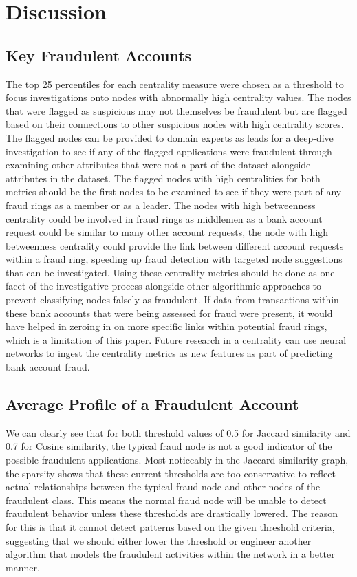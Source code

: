 \documentclass{styles/svproc}
\begin{document}
\section{Discussion}

\subsection{Key Fraudulent Accounts}
The top 25 percentiles for each centrality measure were chosen as a threshold to focus investigations onto nodes with abnormally high centrality values. The nodes that were flagged as suspicious may not themselves be fraudulent but are flagged based on their connections to other suspicious nodes with high centrality scores. The flagged nodes can be provided to domain experts as leads for a deep-dive investigation to see if any of the flagged applications were fraudulent through examining other attributes that were not a part of the dataset alongside attributes in the dataset. The flagged nodes with high centralities for both metrics should be the first nodes to be examined to see if they were part of any fraud rings as a member or as a leader. The nodes with high betweenness centrality could be involved in fraud rings as middlemen as a bank account request could be similar to many other account requests, the node with high betweenness centrality could provide the link between different account requests within a fraud ring, speeding up fraud detection with targeted node suggestions that can be investigated. Using these centrality metrics should be done as one facet of the investigative process alongside other algorithmic approaches to prevent classifying nodes falsely as fraudulent. If data from transactions within these bank accounts that were being assessed for fraud were present, it would have helped in zeroing in on more specific links within potential fraud rings, which is a limitation of this paper. Future research in a centrality can use neural networks to ingest the centrality metrics as new features as part of predicting bank account fraud. 

\subsection{Average Profile of a Fraudulent Account}
We can clearly see that for both threshold values of 0.5 for Jaccard similarity and 0.7 for Cosine similarity, the typical fraud node is not a good indicator of the possible fraudulent applications. Most noticeably in the Jaccard similarity graph, the sparsity shows that these current thresholds are too conservative to reflect actual relationships between the typical fraud node and other nodes of the fraudulent class. This means the normal fraud node will be unable to detect fraudulent behavior unless these thresholds are drastically lowered. The reason for this is that it cannot detect patterns based on the given threshold criteria, suggesting that we should either lower the threshold or engineer another algorithm that models the fraudulent activities within the network in a better manner.
\end{document}
